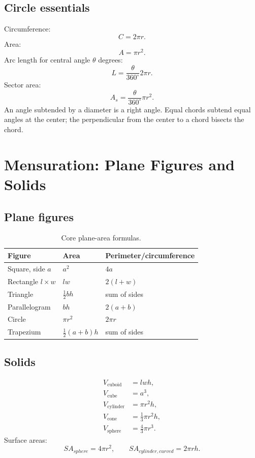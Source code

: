 \documentclass[12pt,a4paper,oneside]{book}
\begin{document}
\section{Circle essentials}
Circumference:
\[C=2\pi r.\]
Area:
\[A=\pi r^2.\]
Arc length for central angle \(\theta\) degrees:
\[L=\frac{\theta}{360^\circ}2\pi r.\]
Sector area:
\[A_s=\frac{\theta}{360^\circ}\pi r^2.\]
An angle subtended by a diameter is a right angle. Equal chords subtend equal angles at the center; the perpendicular from the center to a chord bisects the chord.

\chapter[Mensuration]{Mensuration: Plane Figures and Solids}
\section{Plane figures}
\begin{table}[htbp]
\centering
\caption{Core plane-area formulas.}
\label{tab:areas}
\begin{tabular}{@{}lll@{}}
\toprule
Figure & Area & Perimeter/circumference \\
\midrule
Square, side \(a\) & \(a^2\) & \(4a\) \\
Rectangle \(l\times w\) & \(lw\) & \(2(l+w)\) \\
Triangle & \(\frac12 bh\) & sum of sides \\
Parallelogram & \(bh\) & \(2(a+b)\) \\
Circle & \(\pi r^2\) & \(2\pi r\) \\
Trapezium & \(\frac12(a+b)h\) & sum of sides \\
\bottomrule
\end{tabular}
\end{table}

\section{Solids}
\begin{align*}
V_{\text{cuboid}}&=lwh,\\
V_{\text{cube}}&=a^3,\\
V_{\text{cylinder}}&=\pi r^2h,\\
V_{\text{cone}}&=\frac13\pi r^2h,\\
V_{\text{sphere}}&=\frac43\pi r^3.
\end{align*}
Surface areas:
\[SA_{sphere}=4\pi r^2,\qquad SA_{cylinder,curved}=2\pi rh.\]
\end{document}
